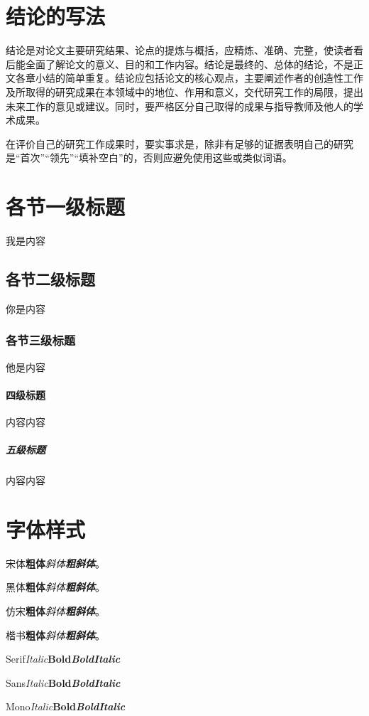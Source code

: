 \documentclass[type = bachelor]{whu-thesis}
\begin{document}
\section{结论的写法}
结论是对论文主要研究结果、论点的提炼与概括，应精炼、准确、完整，使读者看后能全面了解论文的意义、目的和工作内容。结论是最终的、总体的结论，不是正文各章小结的简单重复。结论应包括论文的核心观点，主要阐述作者的创造性工作及所取得的研究成果在本领域中的地位、作用和意义，交代研究工作的局限，提出未来工作的意见或建议。同时，要严格区分自己取得的成果与指导教师及他人的学术成果。

在评价自己的研究工作成果时，要实事求是，除非有足够的证据表明自己的研究是“首次”“领先”“填补空白”的，否则应避免使用这些或类似词语。

\section{各节一级标题}
我是内容

\subsection{各节二级标题}
你是内容

\subsubsection{各节三级标题}
他是内容

\paragraph{四级标题}
内容内容

\subparagraph{五级标题}
内容内容

\section{字体样式}
宋体\quad \textbf{粗体}\quad \textit{斜体}\quad \textbf{\textit{粗斜体}}。

{\heiti 黑体\quad \textbf{粗体}\quad \textit{斜体}\quad \textbf{\textit{粗斜体}}}。

{\fangsong 仿宋\quad \textbf{粗体}\quad \textit{斜体}\quad \textbf{\textit{粗斜体}}}。

{\kaishu 楷书\quad \textbf{粗体}\quad \textit{斜体}\quad \textbf{\textit{粗斜体}}}。

Serif\quad \textit{Italic}\quad \textbf{Bold}\quad \textbf{\textit{BoldItalic}}

{\sffamily Sans\quad \textit{Italic}\quad \textbf{Bold}\quad \textbf{\textit{BoldItalic}}}

{\ttfamily Mono\quad \textit{Italic}\quad \textbf{Bold}\quad \textbf{\textit{BoldItalic}}}
\end{document}
